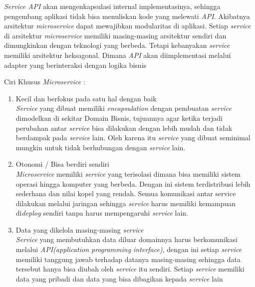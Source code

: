 \textit{Service API} akan mengenkapsulasi internal implementasinya, sehingga pengembang aplikasi tidak bisa menuliskan kode yang melewati \textit{API}. Akibatnya arsitektur \textit{microservice} dapat mewajibkan modularitas di aplikasi.  Setiap \textit{service} di arsitektur \textit{microservice} memiliki masing-masing arsitektur sendiri dan dimungkinkan dengan teknologi yang berbeda. Tetapi kebanyakan \textit{service} memiliki arsitektur heksagonal. Dimana \textit{API} akan diimplementasi melalui adapter yang berinteraksi dengan logika bisnis \cite{7}

Ciri Khusus \textit{Microservice} \cite{6,7,8}:	
\begin{enumerate}[leftmargin=1.3cm]
	\item Kecil dan berfokus pada satu hal dengan baik\\
	\textit{Service} yang dibuat memiliki \textit{encapsulation} dengan pembuatan \textit{service} dimodelkan di sekitar Domain Bisnis, tujuannya agar ketika terjadi perubahan antar \textit{service} bisa dilakukan dengan lebih mudah dan tidak berdampak pada \textit{service} lain. Oleh karena itu \textit{service} yang dibuat seminimal mungkin untuk tidak berhubungan dengan \textit{service} lain. 
	\item Otonomi / Bisa berdiri sendiri\\
	\textit{Microservice} memiliki \textit{service} yang terisolasi dimana bisa memiliki sistem operasi hingga komputer yang berbeda. Dengan ini sistem terdistribusi lebih sederhana dan nilai kopel yang rendah. Semua komunikasi antar service dilakukan melalui jaringan sehingga \textit{service} harus memiliki kemampuan di\textit{deploy} sendiri tanpa harus mempengaruhi \textit{service} lain.
	\item Data yang dikelola masing-masing \textit{service}\\
	\textit{Service} yang membutuhkan data diluar domainnya harus berkomunikasi melalui \textit{API(application programming interface)}, dengan ini setiap \textit{service} memiliki tanggung jawab terhadap datanya masing-masing sehingga data tersebut hanya bisa diubah oleh \textit{service} itu sendiri. Setiap \textit{service} memiliki data yang pribadi dan data yang bisa dibagikan kepada \textit{service} lain
\end{enumerate}	

